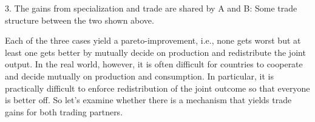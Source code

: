 3. The gains from specialization and trade are shared by A and B: Some trade structure between the two shown above.

Each of the three cases yield a pareto-improvement, i.e., none gets worst but at least one gets better by mutually decide on production and redistribute the joint output. In the real world, however, it is often difficult for countries to cooperate and decide mutually on production and consumption. In particular, it is practically difficult to enforce redistribution of the joint outcome so that everyone is better off. 
So let's examine whether there is a mechanism that yields trade gains for both trading partners.

%



